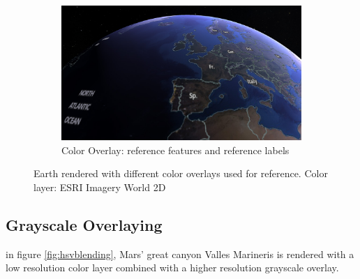 \begin{figure}[h]
    \par\bigskip
    \begin{subfigure}[bt]{0.90\textwidth}
        \includegraphics[width=\textwidth]{figures/results/screenshots/coloroverlay3.jpg}
        \caption{Color Overlay: reference features and reference labels \cite{gibs}}
    \end{subfigure}
    \caption{Earth rendered with different color overlays used for reference. Color layer: ESRI Imagery World 2D \cite{imageryworld2d}}
    \label{fig:coloroverlays}
\end{figure}

\clearpage
\subsection{Grayscale Overlaying}
\FloatBarrier
in figure \ref{fig:hsvblending}, Mars' great canyon Valles Marineris is rendered with a low resolution color layer combined with a higher resolution grayscale overlay.

